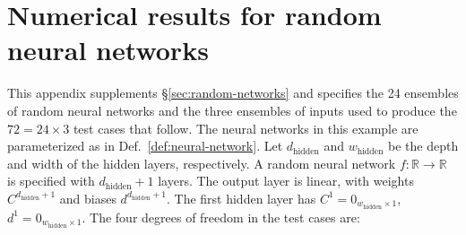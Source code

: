 \documentclass{article}
\begin{document}
\section{Numerical results for random neural networks}
\label{app:random-neural-networks}
This appendix supplements \S\ref{sec:random-networks} and specifies the 24 ensembles of random neural networks and the three ensembles of inputs used to produce the \(72 = 24 \times 3\) test cases that follow.
The neural networks in this example are parameterized as in Def.~\ref{def:neural-network}.
Let \(d_\mathrm{hidden}\) and \(w_\mathrm{hidden}\) be the depth and width of the hidden layers, respectively.
A random neural network \(f:\mathbb{R} \to \mathbb{R}\) is specified with \(d_\mathrm{hidden} + 1\) layers.
The output layer is linear, with weights \(C^{d_\mathrm{hidden}+1}\) and biases \(d^{d_\mathrm{hidden}+1}\).
The first hidden layer has \(C^1 = 0_{w_\mathrm{hidden} \times 1}\), \(d^1 = 0_{w_\mathrm{hidden} \times 1}\).
The four degrees of freedom in the test cases are:
\end{document}
